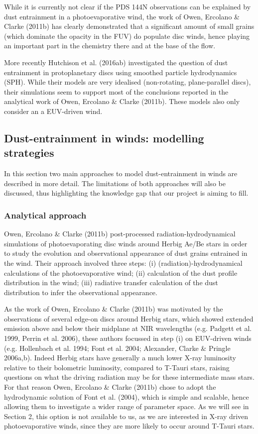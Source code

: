 \documentclass[10pt,fleqn,twoside]{article}
\begin{document}
While it is currently not clear if the PDS 144N observations can be
explained by dust entrainment in a photoevaporative wind, the work of
Owen, Ercolano \& Clarke (2011b) has clearly demonstrated that a
significant amount of small grains (which dominate the opacity in the
FUV) do populate disc winds, hence playing an important part in the
chemistry there and at the base of the flow. 

More recently Hutchison et al. (2016ab) investigated the question of
dust entrainment in protoplanetary discs using smoothed particle
hydrodynamics (SPH). While their models are very idealised (non-rotating,
plane-parallel discs), their simulations seem to support most of the
conclusions reported in the analytical work of Owen, Ercolano \&
Clarke (2011b). These models also only consider an a EUV-driven wind.  

\subsection*{Dust-entrainment in winds: modelling strategies}

In this section two main approaches to model dust-entrainment in
winds are described in more detail. The limitations of both approaches
will also be discussed, thus highlighting the knowledge gap that our
project is aiming to fill. 

\subsubsection*{Analytical approach}\label{sec:analytical_approach}

Owen, Ercolano \& Clarke (2011b) post-processed
radiation-hydrodynamical simulations of photoevaporating disc winds
around Herbig Ae/Be stars in order to study the evolution and
observational appearance of dust grains entrained in the wind. Their
approach involved three steps: (i) (radiation)-hydrodynamical
calculations of the photoevaporative wind; (ii) calculation of the
dust profile distribution in the wind; (iii) radiative transfer
calculation of the dust distribution to infer the observational
appearance. 

As the work of Owen, Ercolano \& Clarke (2011b) was motivated by the
observations of several edge-on discs around Herbig stars, which
showed extended emission above and below their midplane at NIR
wavelengths (e.g. Padgett et al. 1999, Perrin et al. 2006), these
authors focussed in step (i)  on EUV-driven winds (e.g. Hollenbach et al. 1994;
Font et al. 2004; Alexander, Clarke \& Pringle 2006a,b). Indeed Herbig
stars have generally a much lower X-ray luminosity relative to their
bolometric luminosity, compared to T-Tauri stars, raising questions on
what the driving radiation may be for these intermediate mass stars. For
that reason Owen, Ercolano \& Clarke (2011b) chose to adopt the
hydrodynamic solution of Font et al. (2004), which is simple and
scalable, hence allowing them to investigate a wider range of
parameter space. As we will see in Section 2, this option is not
available to us, as we are interested in X-ray driven
photoevaporative winds, since they are more likely to occur around T-Tauri
stars. 
\end{document}
